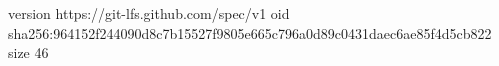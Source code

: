 version https://git-lfs.github.com/spec/v1
oid sha256:964152f244090d8c7b15527f9805e665c796a0d89c0431daec6ae85f4d5cb822
size 46
